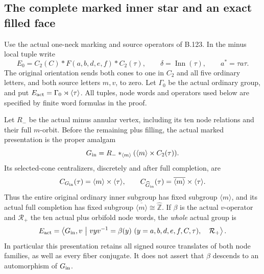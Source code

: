 \subsection*{The complete marked inner star and an exact filled face}

\label{stmt:B135}
Use the actual one-neck marking and source operators of B.123.
In the minus local tuple write
\[
 E_0=C_2(C)*F(a,b,d,e,f)*C_2(\tau),\qquad
 \delta=\operatorname{Inn}(\tau),\qquad a^*=\tau a\tau.
\]
The original orientation sends both cones to one in $C_2$ and
all five ordinary letters, and both source letters $m,v$, to zero.
Let $\Gamma_0$ be the actual ordinary group, and put
$E_{\rm act}=\Gamma_0\rtimes\langle\tau\rangle$.
All tuples, node words and operators used below are specified by
finite word formulas in the proof.

Let $R_-$ be the actual minus annular vertex, including its ten
node relations and their full $m$-orbit. Before the remaining
plus filling, the actual marked presentation is the proper amalgam
\begin{equation}\label{eq:B135-inner-star}
 G_{\rm in}=R_-*_{\langle m\rangle}
                  (\langle m\rangle\times C_2(\tau)).
\end{equation}
Its selected-cone centralizers, discretely and after full completion, are
\[
 C_{G_{\rm in}}(\tau)=\langle m\rangle\times\langle\tau\rangle,
 \qquad
 C_{\widehat G_{\rm in}}(\tau)
      =\overline{\langle m\rangle}\times\langle\tau\rangle.
\]
Thus the entire original ordinary inner subgroup has fixed subgroup
$\langle m\rangle$, and its actual full completion has fixed subgroup
$\overline{\langle m\rangle}\cong\widehat{\mathbb Z}$.
If $\beta$ is the actual $v$-operator and $\mathcal R_+$ the ten
actual plus orbifold node words, the \emph{whole} actual group is
\begin{equation}\label{eq:B135-whole-relative}
 E_{\rm act}=
 \left\langle G_{\rm in},v\ \middle|\
 v yv^{-1}=\beta(y)\ (y=a,b,d,e,f,C,\tau),\quad
 \mathcal R_+\right\rangle .
\end{equation}
In particular this presentation retains all signed source translates
of both node families, as well as every fiber conjugate.
It does not assert that $\beta$ descends to an automorphism of
$G_{\rm in}$.

